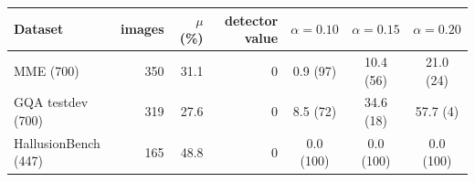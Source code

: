 \begin{tabular}{lrrrccc}
\toprule
Dataset & images & $\mu$ (\%) & detector value & $\alpha{=}0.10$ & $\alpha{=}0.15$ & $\alpha{=}0.20$\\
\midrule
MME (700) & 350 & 31.1 & 0 & 0.9 (97) & 10.4 (56) & 21.0 (24)\\
GQA testdev (700) & 319 & 27.6 & 0 & 8.5 (72) & 34.6 (18) & 57.7 (4)\\
HallusionBench (447) & 165 & 48.8 & 0 & 0.0 (100) & 0.0 (100) & 0.0 (100)\\
\bottomrule
\end{tabular}
